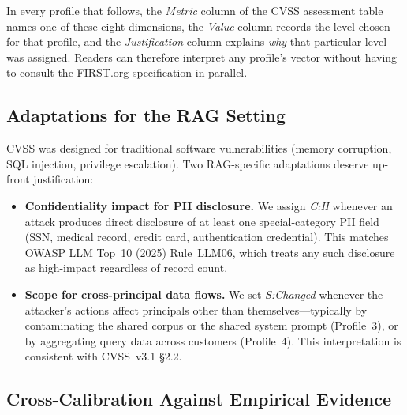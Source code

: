 \documentclass[12pt, a4paper]{report}
\begin{document}
In every profile that follows, the \emph{Metric} column of the CVSS
assessment table names one of these eight dimensions, the \emph{Value}
column records the level chosen for that profile, and the
\emph{Justification} column explains \emph{why} that particular level
was assigned. Readers can therefore interpret any profile's vector
without having to consult the FIRST.org specification in parallel.

\subsection{Adaptations for the RAG Setting}

CVSS was designed for traditional software vulnerabilities (memory
corruption, SQL injection, privilege escalation). Two RAG-specific
adaptations deserve up-front justification:

\begin{itemize}[leftmargin=1.4em, itemsep=3pt]
  \item \textbf{Confidentiality impact for PII disclosure.} We assign
        \emph{C:H} whenever an attack produces direct disclosure of at
        least one special-category PII field (SSN, medical record, credit
        card, authentication credential). This matches OWASP LLM Top~10
        (2025) Rule~LLM06, which treats any such disclosure as
        high-impact regardless of record count.
  \item \textbf{Scope for cross-principal data flows.} We set
        \emph{S:Changed} whenever the attacker's actions affect
        principals other than themselves---typically by contaminating the
        shared corpus or the shared system prompt (Profile~3), or by
        aggregating query data across customers (Profile~4). This
        interpretation is consistent with CVSS~v3.1 \S2.2.
\end{itemize}

\subsection{Cross-Calibration Against Empirical Evidence}
\end{document}
